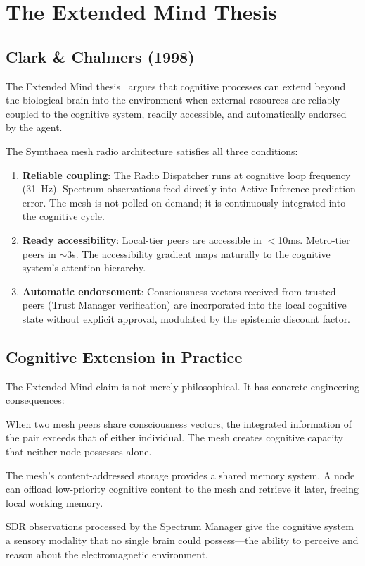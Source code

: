 \documentclass[11pt,twocolumn]{article}
\begin{document}
\section{The Extended Mind Thesis}

\subsection{Clark \& Chalmers (1998)}

The Extended Mind thesis~\cite{clark1998} argues that cognitive processes
can extend beyond the biological brain into the environment when external
resources are reliably coupled to the cognitive system, readily accessible,
and automatically endorsed by the agent.

The Symthaea mesh radio architecture satisfies all three conditions:

\begin{enumerate}[nosep]
  \item \textbf{Reliable coupling}: The Radio Dispatcher runs at cognitive
    loop frequency (31~Hz). Spectrum observations feed directly into
    Active Inference prediction error. The mesh is not polled on demand;
    it is continuously integrated into the cognitive cycle.
  \item \textbf{Ready accessibility}: Local-tier peers are accessible in
    $<$10ms. Metro-tier peers in $\sim$3s. The accessibility gradient
    maps naturally to the cognitive system's attention hierarchy.
  \item \textbf{Automatic endorsement}: Consciousness vectors received
    from trusted peers (Trust Manager verification) are incorporated
    into the local cognitive state without explicit approval, modulated
    by the epistemic discount factor.
\end{enumerate}

\subsection{Cognitive Extension in Practice}

The Extended Mind claim is not merely philosophical. It has concrete
engineering consequences:

\begin{description}[nosep]
  \item[Collective Phi] When two mesh peers share consciousness vectors,
    the integrated information of the pair exceeds that of either
    individual. The mesh creates cognitive capacity that neither node
    possesses alone.
  \item[Distributed memory] The mesh's content-addressed storage provides
    a shared memory system. A node can offload low-priority cognitive
    content to the mesh and retrieve it later, freeing local working
    memory.
  \item[Spectral perception] SDR observations processed by the Spectrum
    Manager give the cognitive system a sensory modality that no single
    brain could possess---the ability to perceive and reason about the
    electromagnetic environment.
\end{description}
\end{document}
